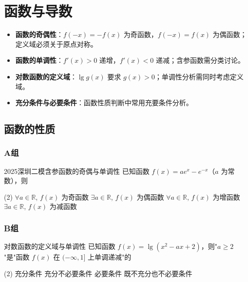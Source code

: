 \chapter{函数与导数}
\setcounter{choicecounter}{0}

\begin{knowledgeframe}
\begin{itemize}
	\item \textbf{函数的奇偶性}：$f(-x)=-f(x)$ 为奇函数，$f(-x)=f(x)$ 为偶函数；定义域必须关于原点对称。
	\item \textbf{函数的单调性}：$f'(x)>0$ 递增，$f'(x)<0$ 递减；含参函数需分类讨论。
	\item \textbf{对数函数的定义域}：$\lg g(x)$ 要求 $g(x)>0$；单调性分析需同时考虑定义域。
	\item \textbf{充分条件与必要条件}：函数性质判断中常用充要条件分析。
\end{itemize}
\end{knowledgeframe}

\section{函数的性质}

\startexercise

\subsection*{A组}

\begin{choice}{2025深圳二模}{含参函数的奇偶与单调性}
	已知函数 $f(x) = ae^x - e^{-x}$（$a$ 为常数），则
	\begin{tasks}(2)
		\task $\forall a \in \mathbb{R}$, $f(x)$ 为奇函数
		\task $\exists a \in \mathbb{R}$, $f(x)$ 为偶函数
		\task $\forall a \in \mathbb{R}$, $f(x)$ 为增函数
		\task $\exists a \in \mathbb{R}$, $f(x)$ 为减函数
	\end{tasks}
\end{choice}

\subsection*{B组}

\begin{choice}{}{对数函数的定义域与单调性}
	已知函数 $f(x) = \lg(x^2 - ax + 2)$，则"$a \ge 2$"是"函数 $f(x)$ 在 $(-\infty, 1]$ 上单调递减"的
	\begin{tasks}(2)
		\task 充分条件
		\task 充分不必要条件
		\task 必要条件
		\task 既不充分也不必要条件
	\end{tasks}
\end{choice}

\stopexercise

